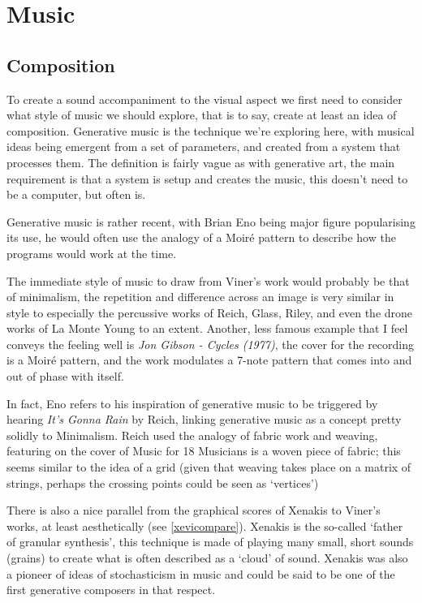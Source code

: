 \chapter{Music}
\section{Composition}
To create a sound accompaniment to the visual aspect we first need to consider
what style of music we should explore, that is to say, create at least an idea
of composition. Generative music is the technique we're exploring here, with
musical ideas being emergent from a set of parameters, and created from a system
that processes them. The definition is fairly vague as with generative art, the
main requirement is that a system is setup and creates the music, this doesn't
need to be a computer, but often is.

Generative music is rather recent, with Brian Eno being major figure
popularising its use, he would often use the analogy of a Moir\'{e} pattern to
describe how the programs would work at the time.  

The immediate style of music to draw from Viner's work would probably be that of
minimalism, the repetition and difference across an image is very similar in
style to especially the percussive works of Reich, Glass, Riley, and even the
drone works of La Monte Young to an extent. Another, less famous example that I
feel conveys the feeling well is \emph{Jon Gibson - Cycles (1977)}, the cover
for the recording is a Moir\'{e} pattern, and the work modulates a 7-note
pattern that comes into and out of phase with itself. 

In fact, Eno refers to his inspiration of generative music to be triggered by
hearing \emph{It's Gonna Rain} by Reich, linking generative music as a concept
pretty solidly to Minimalism. Reich used the analogy of fabric work and weaving,
featuring on the cover of Music for 18 Musicians is a woven piece of fabric;
this seems similar to the idea of a grid (given that weaving takes place on a
matrix of strings, perhaps the crossing points could be seen as `vertices')

There is also a nice parallel from the graphical scores of Xenakis to Viner's
works, at least aesthetically (see \autoref{xevicompare}). Xenakis is the
so-called `father of granular synthesis', this technique is made of playing many
small, short sounds (grains) to create what is often described as a `cloud' of
sound. Xenakis was also a pioneer of ideas of stochasticism in music and could
be said to be one of the first generative composers in that respect. 

